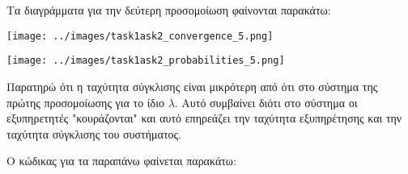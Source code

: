 \documentclass[12pt]{article}
\begin{document}
Τα διαγράμματα για την δεύτερη προσομοίωση φαίνονται παρακάτω:

\begin{center}
    \texttt{[image: ../images/task1ask2\_convergence\_5.png]}
\end{center}

\begin{center}
    \texttt{[image: ../images/task1ask2\_probabilities\_5.png]}
\end{center}

Παρατηρώ ότι η ταχύτητα σύγκλισης είναι μικρότερη από ότι στο σύστημα 
της πρώτης προσομοίωσης για το ίδιο $\lambda$. Αυτό συμβαίνει διότι
στο σύστημα οι εξυπηρετητές "κουράζονται" και αυτό επηρεάζει την ταχύτητα
εξυπηρέτησης και την ταχύτητα σύγκλισης του συστήματος.

Ο κώδικας για τα παραπάνω φαίνεται παρακάτω:



 
\end{document}
